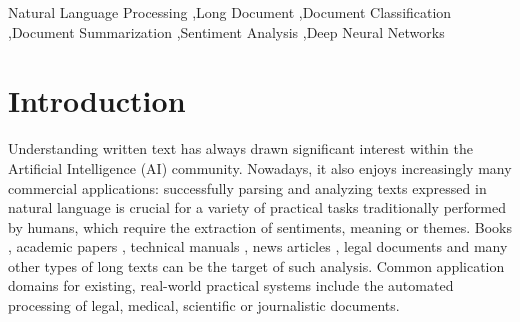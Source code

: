 \documentclass[preprint,review,10pt]{elsarticle}
\begin{document}
\begin{frontmatter}
		
		
		\begin{keyword}
			Natural Language Processing \sep Long Document \sep Document Classification \sep Document Summarization \sep Sentiment Analysis \sep Deep Neural Networks
		\end{keyword}
		
	\end{frontmatter}
	
	\section{Introduction}
	Understanding written text has always drawn significant interest within the Artificial Intelligence (AI) community. Nowadays, it also enjoys increasingly many commercial applications: successfully parsing and analyzing texts expressed in natural language is crucial for a variety of practical tasks traditionally performed by humans, which require the extraction of sentiments, meaning or themes. Books \cite{worsham}, academic papers \cite{gales}, technical manuals \cite{nabizadeh}, news articles \cite{shuo}, legal documents \cite{merchant} and many other types of long texts can be the target of such analysis. Common application domains for existing, real-world practical systems include the automated processing of legal, medical, scientific or journalistic documents.
	
\end{document}

